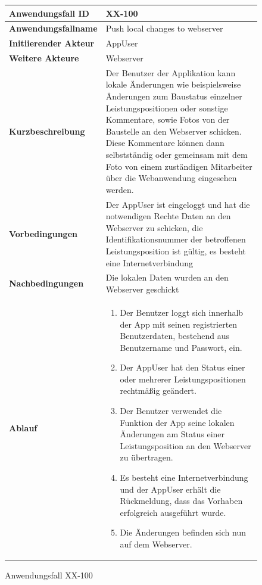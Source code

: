 \newpage

\begin{figure}[h]
	\centering
	\begin{tabularx}{\textwidth}{ X | X }
		\textbf{Anwendungsfall ID} & XX-100 \\ \hline
		\textbf{Anwendungsfallname} & Push local changes to webserver\\ \hline
		\textbf{Initiierender Akteur} & AppUser \\ \hline
		\textbf{Weitere Akteure} & Webserver  \\ \hline
		\textbf{Kurzbeschreibung} & Der Benutzer der Applikation kann lokale \"Anderungen wie beispielsweise \"Anderungen zum Baustatus einzelner Leistungspositionen oder sonstige Kommentare,  sowie Fotos von der Baustelle an den Webserver schicken.  Diese Kommentare k\"onnen dann selbstst\"andig oder gemeinsam mit dem Foto von einem zust\"andigen Mitarbeiter \"uber die Webanwendung eingesehen werden.  \\ \hline
		\textbf{Vorbedingungen} & Der AppUser ist eingeloggt und hat die notwendigen Rechte Daten an den Webserver zu schicken, die Identifikationsnummer der betroffenen Leistungsposition ist g\"ultig,  es besteht eine Internetverbindung   \\ \hline
		\textbf{Nachbedingungen} & Die lokalen Daten wurden an den Webserver geschickt\\ \hline
		\textbf{Ablauf} &
			\begin{enumerate}
				\item Der Benutzer loggt sich innerhalb der App mit seinen registrierten Benutzerdaten, bestehend aus Benutzername und Passwort,  ein.  
				\item Der AppUser hat den Status einer oder mehrerer Leistungspositionen rechtm\"a{\ss}ig ge\"andert.
				\item Der Benutzer verwendet die Funktion der App seine lokalen \"Anderungen am Status einer Leistungsposition an den Webserver zu \"ubertragen.
				\item Es besteht eine Internetverbindung und der AppUser erh\"alt die R\"uckmeldung,  dass das Vorhaben erfolgreich ausgef\"uhrt wurde.  
				\item Die \"Anderungen befinden sich nun auf dem Webserver.
			\end{enumerate}
			\end{tabularx}
	\caption{Anwendungsfall XX-100}
	\label{fig:anwendungsfall-app-tabelle-xx-1}
\end{figure}
